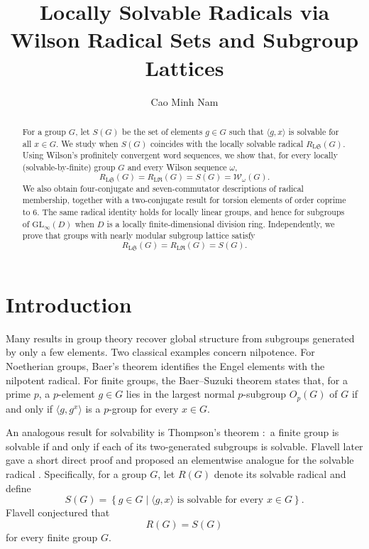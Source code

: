 \documentclass[11pt, reqno]{amsart}
\title[Locally solvable radicals]{Locally Solvable Radicals via Wilson Radical Sets and Subgroup Lattices}
\author{Cao Minh Nam}
\numberwithin{equation}{section}
\theoremstyle{definition}
\numberwithin{equation}{section}
\begin{document}
\begin{abstract} 
For a group $G$, let $S(G)$ be the set of elements $g \in G$ such that $\langle g, x \rangle$ is solvable for all $x \in G$. We study when $S(G)$ coincides with the locally solvable radical $R_{\mathrm{L}\mathfrak{S}}(G)$. Using Wilson's profinitely convergent word sequences, we show that, for every locally (solvable-by-finite) group $G$ and every Wilson sequence $\omega$, $$ R_{\mathrm{L}\mathfrak S}(G) = R_{\mathrm{L}\mathfrak R}(G) = S(G) = \mathcal W_\omega(G). $$ We also obtain four-conjugate and seven-commutator descriptions of radical membership, together with a two-conjugate result for torsion elements of order coprime to $6$. The same radical identity holds for locally linear groups, and hence for subgroups of $\mathrm{GL}_\infty(D)$ when $D$ is a locally finite-dimensional division ring. Independently, we prove that groups with nearly modular subgroup lattice satisfy $$R_{\mathrm{L}\mathfrak S}(G)=R_{\mathrm{L}\mathfrak R}(G)=S(G).$$
\end{abstract}

\maketitle

\section{Introduction}
Many results in group theory recover global structure from subgroups generated by only a few elements. 
Two classical examples concern nilpotence. For Noetherian groups, Baer's theorem \cite{Baer} identifies the Engel elements with the nilpotent radical. 
For finite groups, the Baer--Suzuki theorem \cite{Suzuki} states that, for a prime $p$, a $p$-element $g\in G$ lies in the largest normal $p$-subgroup $O_p(G)$ of $G$ if and only if  $\langle g,g^x\rangle$ is a $p$-group for every $x\in G$.

An analogous result for solvability is Thompson's theorem \cite{Thompson68}:~a finite group is solvable if and only if each of its two-generated subgroups is solvable. Flavell \cite{Flavell95} later gave a short direct proof  and proposed an elementwise analogue for the solvable radical \cite[Conjecture~B]{Flavell01}. Specifically, for a group $G$, let $R(G)$ denote its solvable radical and define
$$S(G) = \left\{ g\in G \mid \langle g,x\rangle \text{ is solvable for every }x\in G \right\}.$$
Flavell conjectured that $$R(G)=S(G)$$ for every finite group $G$.
\end{document}
